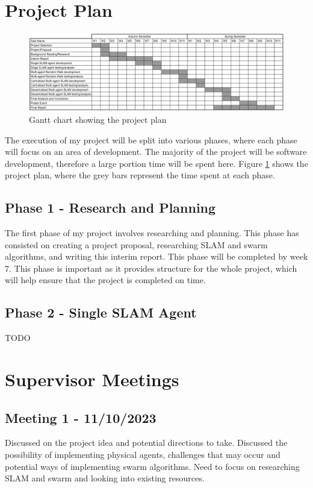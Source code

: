 \documentclass[12pt]{article}
\begin{document}
\section{Project Plan}
\begin{figure}[H]
    \centering
    \includegraphics[width=0.8\linewidth]{gantt_chart.png}
    \caption{Gantt chart showing the project plan}
    \label{fig:gantt_chart}
\end{figure}
The execution of my project will be split into various phases, where each phase will focus on an area of development. The
majority of the project will be software development, therefore a large portion time will be spent here. Figure
\ref{fig:gantt_chart} shows the project plan, where the grey bars represent the time spent at each phase.

\subsection{Phase 1 - Research and Planning}
The first phase of my project involves researching and planning. This phase has consisted on creating a project proposal,
researching SLAM and swarm algorithms, and writing this interim report. This phase will be completed by week 7. This phase is
important as it provides structure for the whole project, which will help ensure that the project is completed on time.
\subsection{Phase 2 - Single SLAM Agent}
TODO
\section{Supervisor Meetings}
\subsection{Meeting 1 - 11/10/2023}
Discussed on the project idea and potential directions to take. Discussed the possibility of implementing physical agents,
challenges that may occur and potential ways of implementing swarm algorithms. Need to focus on researching SLAM and swarm
and looking into existing resources.
\end{document}
